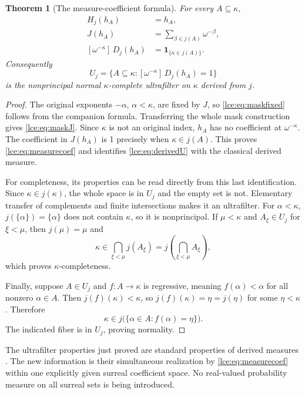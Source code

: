 \documentclass[11pt,letterpaper]{article}
\numberwithin{equation}{section}
\newtheorem{theorem}{Theorem}[section]
\theoremstyle{definition}
\theoremstyle{remark}
\newcommand{\coef}[2]{[\omega^{#1}]\,#2}
\newcommand{\set}[1]{\{#1\}}
\begin{document}
\begin{theorem}[The measure-coefficient formula]\label{lce:thm:measure}
For every $A\subseteq\kappa$,
\begin{align}
 H_j(h_A)&=h_A,\label{lce:eq:maskfixed}\\
 J(h_A)&=\sum_{\beta\in j(A)}\omega^{-\beta},\label{lce:eq:maskJ}\\
 \coef{-\kappa}{D_j(h_A)}&=\mathbf 1_{\{\kappa\in j(A)\}}.
 \label{lce:eq:measurecoef}
\end{align}
Consequently
\begin{equation}\label{lce:eq:derivedU}
 U_j=\set{A\subseteq\kappa:\coef{-\kappa}{D_j(h_A)}=1}
\end{equation}
is the nonprincipal normal $\kappa$-complete ultrafilter on $\kappa$
derived from $j$.
\end{theorem}
\begin{proof}
The original exponents $-\alpha$, $\alpha<\kappa$, are fixed by $J$, so
\eqref{lce:eq:maskfixed} follows from the companion formula. Transferring the
whole mask construction gives \eqref{lce:eq:maskJ}. Since $\kappa$ is not an
original index, $h_A$ has no coefficient at $\omega^{-\kappa}$.
The coefficient in $J(h_A)$ is 1 precisely when $\kappa\in j(A)$.
This proves \eqref{lce:eq:measurecoef} and identifies \eqref{lce:eq:derivedU}
with the classical derived measure.

For completeness, its properties can be read directly from this last
identification. Since $\kappa\in j(\kappa)$, the whole space is in $U_j$
and the empty set is not. Elementary transfer of complements and finite
intersections makes it an ultrafilter. For $\alpha<\kappa$,
$j(\{\alpha\})=\{\alpha\}$ does not contain $\kappa$, so it is
nonprincipal. If $\mu<\kappa$ and $A_\xi\in U_j$ for $\xi<\mu$, then
$j(\mu)=\mu$ and
\[
 \kappa\in\bigcap_{\xi<\mu}j(A_\xi)
       =j\left(\bigcap_{\xi<\mu}A_\xi\right),
\]
which proves $\kappa$-completeness.

Finally, suppose $A\in U_j$ and $f:A\to\kappa$ is regressive, meaning
$f(\alpha)<\alpha$ for all nonzero $\alpha\in A$. Then
$j(f)(\kappa)<\kappa$, so $j(f)(\kappa)=\eta=j(\eta)$ for some
$\eta<\kappa$. Therefore
\[
 \kappa\in j\bigl(\{\alpha\in A:f(\alpha)=\eta\}\bigr).
\]
The indicated fiber is in $U_j$, proving normality.
\end{proof}

The ultrafilter properties just proved are standard properties of derived
measures \cite{Neeman}. The new information is their simultaneous realization
by \eqref{lce:eq:measurecoef} within one explicitly given surreal coefficient
space. No real-valued probability measure on all surreal sets is being
introduced.
\end{document}
